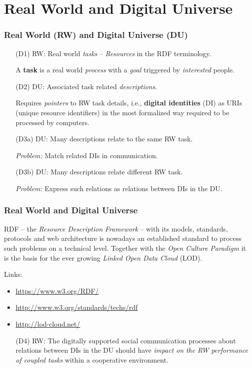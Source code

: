 \documentclass{beamer}
\begin{document}
\section{Real World and Digital Universe}
\begin{frame}
\frametitle{Real World (RW) and Digital Universe (DU)}
\begin{itemize}
\item[(D1)] RW: Real world \emph{tasks} -- \emph{Resources} in the RDF
  terminology.

  A \textbf{task} is a real world \emph{process} with a \emph{goal} triggered
  by \emph{interested} people.
\item[(D2)] DU: Associated task related \emph{descriptions}.  

  Requires \emph{pointers} to RW task details, i.e., \textbf{digital
    identities} (DI) as URIs (unique resource identifiers) in the most
  formalized way required to be processed by computers.
\item [(D3a)] DU: Many descriptions relate to the same RW task. 

  \emph{Problem:} Match related DIs in communication. 
\item [(D3b)] DU: Many descriptions relate different RW task. 

  \emph{Problem:} Express such relations as relations between DIs in the DU. 
\end{itemize}
\end{frame}
\begin{frame}
\frametitle{Real World and Digital Universe}

RDF -- the \emph{Resource Description Framework} -- with its models, standards,
protocols and web architecture is nowadays an established standard to process
such problems on a technical level. Together with the \emph{Open Culture
  Paradigm} it is the basis for the ever growing \emph{Linked Open Data
  Cloud} (LOD). 

Links:
\begin{itemize}\itemsep0pt
\item \url{https://www.w3.org/RDF/}
\item \url{http://www.w3.org/standards/techs/rdf}
\item \url{http://lod-cloud.net/}
\end{itemize}

\begin{itemize}
\item[(D4)] RW: The digitally supported social communication processes about
  relations between DIs in the DU should have \emph{impact on the RW
    performance of coupled tasks} within a cooperative environment.
\end{itemize}
\end{frame}
\end{document}
